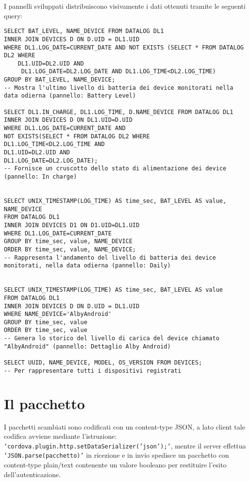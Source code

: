 \documentclass[target=bach]{thud}
\begin{document}
                    I pannelli sviluppati distribuiscono visivamente i dati ottenuti tramite le seguenti query:
\begin{lstlisting}
SELECT BAT_LEVEL, NAME_DEVICE FROM DATALOG DL1
INNER JOIN DEVICES D ON D.UID = DL1.UID
WHERE DL1.LOG_DATE=CURRENT_DATE AND NOT EXISTS (SELECT * FROM DATALOG DL2 WHERE
    DL1.UID=DL2.UID AND
     DL1.LOG_DATE=DL2.LOG_DATE AND DL1.LOG_TIME<DL2.LOG_TIME)
GROUP BY BAT_LEVEL, NAME_DEVICE;
-- Mostra l'ultimo livello di batteria dei device monitorati nella data odierna (pannello: Battery Level)

SELECT DL1.IN_CHARGE, DL1.LOG_TIME, D.NAME_DEVICE FROM DATALOG DL1
INNER JOIN DEVICES D ON DL1.UID=D.UID
WHERE DL1.LOG_DATE=CURRENT_DATE AND
NOT EXISTS(SELECT * FROM DATALOG DL2 WHERE
DL1.LOG_TIME<DL2.LOG_TIME AND
DL1.UID=DL2.UID AND
DL1.LOG_DATE=DL2.LOG_DATE);
-- Fornisce un cruscotto dello stato di alimentazione dei device (pannello: In charge)


SELECT UNIX_TIMESTAMP(LOG_TIME) AS time_sec, BAT_LEVEL AS value, NAME_DEVICE
FROM DATALOG DL1
INNER JOIN DEVICES D1 ON D1.UID=DL1.UID
WHERE DL1.LOG_DATE=CURRENT_DATE
GROUP BY time_sec, value, NAME_DEVICE
ORDER BY time_sec, value, NAME_DEVICE;
-- Rappresenta l'andamento del livello di batteria dei device monitorati, nella data odierna (pannello: Daily)


SELECT UNIX_TIMESTAMP(LOG_TIME) AS time_sec, BAT_LEVEL AS value
FROM DATALOG DL1
INNER JOIN DEVICES D ON D.UID = DL1.UID
WHERE NAME_DEVICE='AlbyAndroid'
GROUP BY time_sec, value
ORDER BY time_sec, value
-- Genera lo storico del livello di carica del device chiamato "AlbyAndroid" (pannello: Dettaglio Alby Android)

SELECT UUID, NAME_DEVICE, MODEL, OS_VERSION FROM DEVICES;
-- Per rappresentare tutti i dispositivi registrati

\end{lstlisting}

\section{Il pacchetto}
    I pacchetti scambiati sono codificati con un content-type JSON, a lato client tale codifica avviene mediante l'istruzione: \texttt{`cordova.plugin.http.setDataSerializer('json');'}, mentre il server effettua \texttt{`JSON.parse(pacchetto)'} in ricezione e in invio spedisce un pacchetto con content-type plain/text contenente un valore booleano per restituire l'esito dell'autenticazione.
\end{document}

